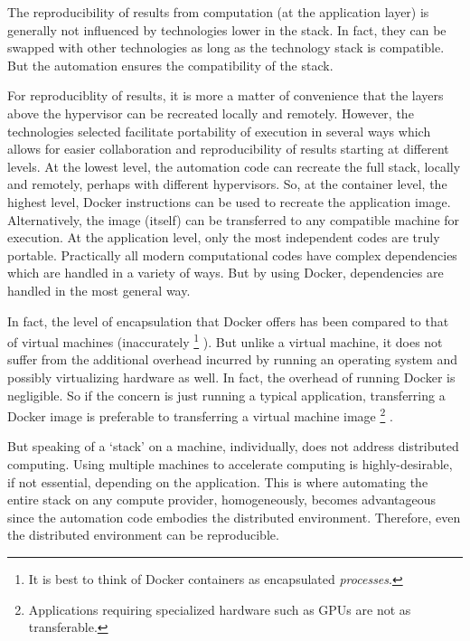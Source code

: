 The reproducibility of results from computation (at the application layer) is generally not influenced by technologies lower in the stack.
%
In fact, they can be swapped with other technologies as long as the technology stack is compatible.
%
But the automation ensures the compatibility of the stack.


For reproduciblity of results, it is more a matter of convenience that the layers above the hypervisor can be recreated locally and remotely.
%
However, the technologies selected facilitate portability of execution in several ways which allows for easier collaboration and reproducibility of results starting at different levels.
%
At the lowest level, the automation code can recreate the full stack, locally and remotely, perhaps with different hypervisors.
%
So, at the container level, the highest level, \textsf{Docker} instructions can be used to recreate the application image.
%
Alternatively, the image (itself) can be transferred to any compatible machine for execution.
%
At the application level, only the most independent codes are truly portable.
%
Practically all modern computational codes have complex dependencies which are handled in a variety of ways.
%
But by using \textsf{Docker}, dependencies are handled in the most general way.


In fact, the level of encapsulation that \textsf{Docker} offers has  been compared to that of virtual machines (inaccurately%
\footnote{It is best to think of \textsf{Docker} containers as encapsulated \emph{processes}.}%
).
%
But unlike a virtual machine, it does not suffer from the additional overhead incurred by running an operating system and possibly virtualizing hardware as well.
%
In fact, the overhead of running \textsf{Docker} is negligible.
%
So if the concern is just running a typical application, transferring a \textsf{Docker} image is preferable to transferring a virtual machine image%
\footnote{
Applications requiring specialized hardware such as GPUs are not as transferable.
}%
.


But speaking of a `stack' on a machine, individually, does not address distributed computing.
%
Using multiple machines to accelerate computing is highly-desirable, if not essential, depending on the application.
%
This is where automating the entire stack on any compute provider, homogeneously, becomes advantageous since the automation code embodies the distributed environment.
%
Therefore, even the distributed environment can be reproducible.



